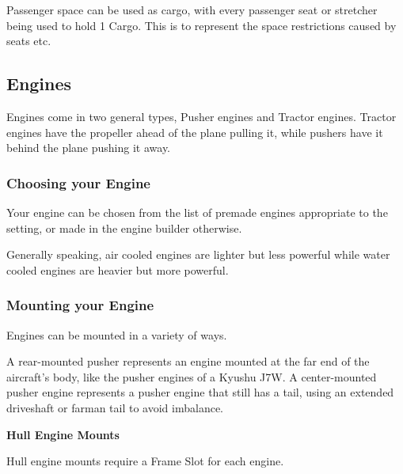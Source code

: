 \documentclass{article}
\begin{document}
Passenger space can be used as cargo, with every passenger seat
or stretcher being used to hold 1 Cargo. This is to represent the space
restrictions caused by seats etc.

\subsection{Engines}
\label{_Engines}

Engines come in two general types, Pusher engines and Tractor engines.
Tractor engines have the propeller ahead of the plane pulling it, while
pushers have it behind the plane pushing it away.

\subsubsection{Choosing your Engine}
\label{_Choosing your Engine}

Your engine can be chosen from the list of premade engines appropriate
to the setting, or made in the engine builder otherwise.

Generally speaking, air cooled engines are lighter but less powerful
while water cooled engines are heavier but more powerful.

\subsubsection{Mounting your Engine}
\label{_Mounting your Engine}

Engines can be mounted in a variety of ways.

A rear-mounted pusher represents an engine mounted at the far end of the
aircraft's body, like the pusher engines of a Kyushu J7W. A
center-mounted pusher engine represents a pusher engine that still has a
tail, using an extended driveshaft or farman tail to avoid imbalance.

\textbf{Hull Engine Mounts}

Hull engine mounts require a Frame Slot for each engine.
\end{document}
